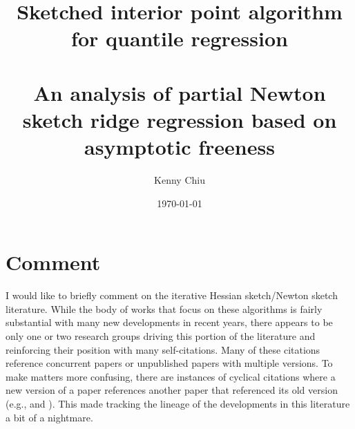 \documentclass[12pt]{article}
\title{Sketched interior point algorithm for quantile regression\\\vspace{0.25em}{\large and}\\\vspace{0.25em}An analysis of partial Newton sketch ridge regression based on asymptotic freeness\vspace{0.25em}} %
\author{Kenny Chiu} %
\date{\today} %
\begin{document}
\maketitle








\newpage


\section{Comment}

I would like to briefly comment on the iterative Hessian sketch/Newton sketch literature. While the body of works that focus on these algorithms is fairly substantial with many new developments in recent years, there appears to be only one or two research groups driving this portion of the literature and reinforcing their position with many self-citations. Many of these citations reference concurrent papers or unpublished papers with multiple versions. To make matters more confusing, there are instances of cyclical citations where a new version of a paper references another paper that referenced its old version (e.g., \citep{Lacotte:2020} and \citep{Lacotte:2020b}). This made tracking the lineage of the developments in this literature a bit of a nightmare.


\newpage




\end{document}
